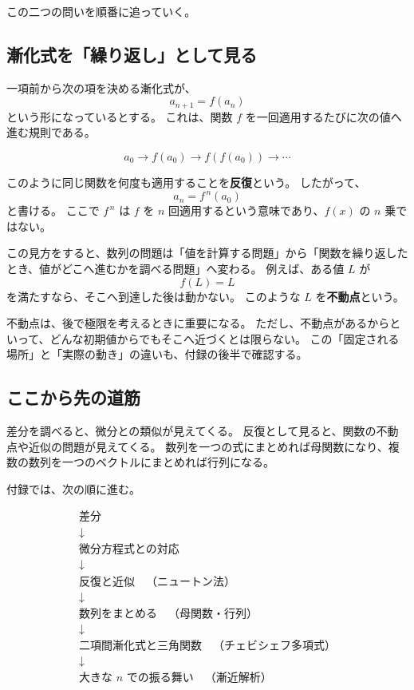 この二つの問いを順番に追っていく。

\subsection{漸化式を「繰り返し」として見る}

一項前から次の項を決める漸化式が、
\[
  a_{n+1}=f(a_n)
\]
という形になっているとする。
これは、関数 $f$ を一回適用するたびに次の値へ進む規則である。

\[
  a_0
  \longrightarrow f(a_0)
  \longrightarrow f(f(a_0))
  \longrightarrow \cdots
\]

このように同じ関数を何度も適用することを\textbf{反復}という。
したがって、
\[
  a_n=f^{\,n}(a_0)
\]
と書ける。
ここで $f^{\,n}$ は $f$ を $n$ 回適用するという意味であり、$f(x)$ の $n$ 乗ではない。

この見方をすると、数列の問題は「値を計算する問題」から「関数を繰り返したとき、値がどこへ進むかを調べる問題」へ変わる。
例えば、ある値 $L$ が
\[
  f(L)=L
\]
を満たすなら、そこへ到達した後は動かない。
このような $L$ を\textbf{不動点}という。

不動点は、後で極限を考えるときに重要になる。
ただし、不動点があるからといって、どんな初期値からでもそこへ近づくとは限らない。
この「固定される場所」と「実際の動き」の違いも、付録の後半で確認する。

\subsection{ここから先の道筋}

差分を調べると、微分との類似が見えてくる。
反復として見ると、関数の不動点や近似の問題が見えてくる。
数列を一つの式にまとめれば母関数になり、複数の数列を一つのベクトルにまとめれば行列になる。

付録では、次の順に進む。

\[
\begin{array}{c}
\text{差分}\\[-2pt]
\downarrow\\[-2pt]
\text{微分方程式との対応}\\[-2pt]
\downarrow\\[-2pt]
\text{反復と近似}\quad\text{（ニュートン法）}\\[-2pt]
\downarrow\\[-2pt]
\text{数列をまとめる}\quad\text{（母関数・行列）}\\[-2pt]
\downarrow\\[-2pt]
\text{二項間漸化式と三角関数}\quad\text{（チェビシェフ多項式）}\\[-2pt]
\downarrow\\[-2pt]
\text{大きな }n\text{ での振る舞い}\quad\text{（漸近解析）}
\end{array}
\]

